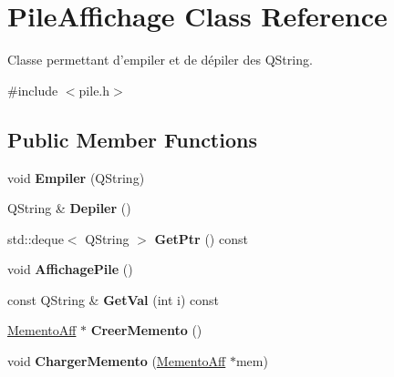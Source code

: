 \hypertarget{class_pile_affichage}{\section{Pile\-Affichage Class Reference}
\label{class_pile_affichage}
}


Classe permettant d'empiler et de dépiler des Q\-String.  




{\ttfamily \#include $<$pile.\-h$>$}

\subsection*{Public Member Functions}
\begin{DoxyCompactItemize}
\item 
\hypertarget{class_pile_affichage_a11bce902517d97e237f99bb36b31bda4}{void {\bfseries Empiler} (Q\-String)}\label{class_pile_affichage_a11bce902517d97e237f99bb36b31bda4}

\item 
\hypertarget{class_pile_affichage_aad2fa732744c8c03ff3f5fa2df874c24}{Q\-String \& {\bfseries Depiler} ()}\label{class_pile_affichage_aad2fa732744c8c03ff3f5fa2df874c24}

\item 
\hypertarget{class_pile_affichage_a5daee2843e955b5f3317ba56e8e99050}{std\-::deque$<$ Q\-String $>$ {\bfseries Get\-Ptr} () const }\label{class_pile_affichage_a5daee2843e955b5f3317ba56e8e99050}

\item 
\hypertarget{class_pile_affichage_a113c2fe93662381bfb58d789123da818}{void {\bfseries Affichage\-Pile} ()}\label{class_pile_affichage_a113c2fe93662381bfb58d789123da818}

\item 
\hypertarget{class_pile_affichage_a04a490c8ab59101a171f1c5cb35a510f}{const Q\-String \& {\bfseries Get\-Val} (int i) const }\label{class_pile_affichage_a04a490c8ab59101a171f1c5cb35a510f}

\item 
\hypertarget{class_pile_affichage_a099c0579bdd31bea548a6fb06e859197}{\hyperlink{class_memento_aff}{Memento\-Aff} $\ast$ {\bfseries Creer\-Memento} ()}\label{class_pile_affichage_a099c0579bdd31bea548a6fb06e859197}

\item 
\hypertarget{class_pile_affichage_aa1eaa41dcfa6317f54f36e3f145dbc4b}{void {\bfseries Charger\-Memento} (\hyperlink{class_memento_aff}{Memento\-Aff} $\ast$mem)}\label{class_pile_affichage_aa1eaa41dcfa6317f54f36e3f145dbc4b}


\end{DoxyCompactItemize}
